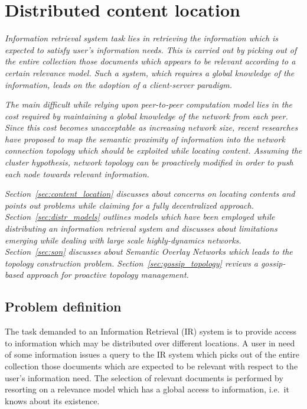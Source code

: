 \chapter{\label{chap:p2p_content_location}Distributed content location}

\textit{Information retrieval system task lies in retrieving the information which is expected to satisfy user's information needs. This is carried out by picking out of the entire collection those documents which appears to be relevant according to a certain relevance model. Such a system, which requires a global knowledge of the information, leads on the adoption of a client-server paradigm.}

\textit{The main difficult while relying upon peer-to-peer computation model lies in the cost required by maintaining a global knowledge of the network from each peer. Since this cost becomes unacceptable as increasing network size, recent researches have proposed to map the semantic proximity of information into the network connection topology which should be exploited while locating content. Assuming the cluster hypothesis, network topology can be proactively modified in order to push each node towards relevant information.}

\textit{Section~\ref{sec:content_location} discusses about concerns on locating contents and points out problems while claiming for a fully decentralized approach. Section~\ref{sec:distr_models} outlines models which have been employed while distributing an information retrieval system and discusses about limitations emerging while dealing with large scale highly-dynamics networks. Section~\ref{sec:son} discusses about Semantic Overlay Networks which leads to the topology construction problem. Section~\ref{sec:gossip_topology} reviews a gossip-based approach for proactive topology management.}

\section{\label{sec:content_location}Problem definition}
The task demanded to an Information Retrieval (IR) system is to provide access to information which may be distributed over different locations. A user in need of some information issues a query to the IR system which picks out of the entire collection those documents which are expected to be relevant with respect to the user's information need. The selection of relevant documents is performed by resorting on a relevance model which has a global access to information, i.e.\ it knows about its existence.

